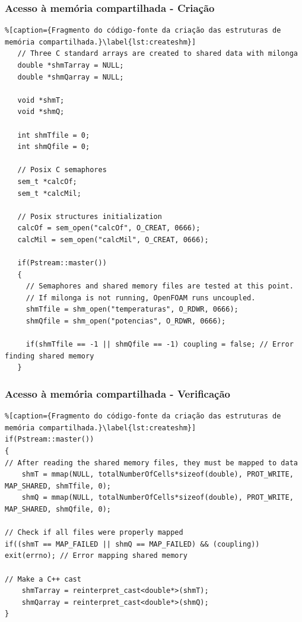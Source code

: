 \documentclass[svgnames,smaller,table]{beamer}
\begin{document}
\begin{frame}[fragile]
  \frametitle{Acesso à memória compartilhada - Criação}
 \begin{lstlisting}%[caption={Fragmento do código-fonte da criação das estruturas de memória compartilhada.}\label{lst:createshm}]
   // Three C standard arrays are created to shared data with milonga
   double *shmTarray = NULL;
   double *shmQarray = NULL;
   
   void *shmT;
   void *shmQ;

   int shmTfile = 0;
   int shmQfile = 0;
   
   // Posix C semaphores
   sem_t *calcOf;
   sem_t *calcMil;
   
   // Posix structures initialization
   calcOf = sem_open("calcOf", O_CREAT, 0666);
   calcMil = sem_open("calcMil", O_CREAT, 0666);
   
   if(Pstream::master())
   {
     // Semaphores and shared memory files are tested at this point.
     // If milonga is not running, OpenFOAM runs uncoupled.
     shmTfile = shm_open("temperaturas", O_RDWR, 0666);
     shmQfile = shm_open("potencias", O_RDWR, 0666);
    
     if(shmTfile == -1 || shmQfile == -1) coupling = false; // Error finding shared memory
   }
 \end{lstlisting}
\end{frame}

\begin{frame}[fragile]
  \frametitle{Acesso à memória compartilhada - Verificação}
 \begin{lstlisting}%[caption={Fragmento do código-fonte da criação das estruturas de memória compartilhada.}\label{lst:createshm}]
if(Pstream::master())
{
// After reading the shared memory files, they must be mapped to data
    shmT = mmap(NULL, totalNumberOfCells*sizeof(double), PROT_WRITE, MAP_SHARED, shmTfile, 0);
    shmQ = mmap(NULL, totalNumberOfCells*sizeof(double), PROT_WRITE, MAP_SHARED, shmQfile, 0);

// Check if all files were properly mapped
if((shmT == MAP_FAILED || shmQ == MAP_FAILED) && (coupling)) exit(errno); // Error mapping shared memory

// Make a C++ cast
    shmTarray = reinterpret_cast<double*>(shmT);
    shmQarray = reinterpret_cast<double*>(shmQ);
}
 \end{lstlisting}
\end{frame}
\end{document}
